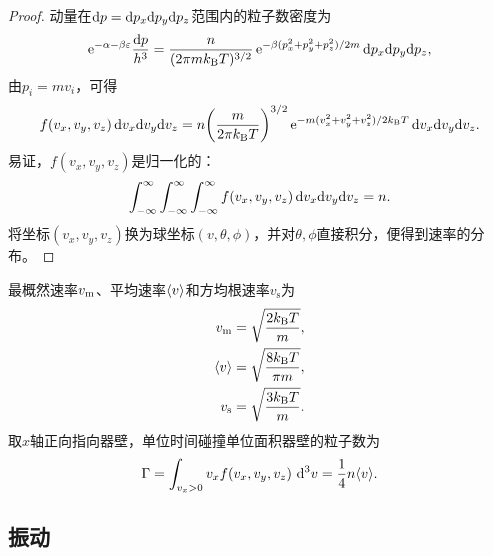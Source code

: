 \begin{proof}
	动量在$\mathop{}\!\mathrm{d} p = \mathop{}\!\mathrm{d} p_x\mathrm{d} p_y\mathrm{d} p_z$范围内的粒子数密度为
	\[
		\mathop{}\!\mathrm{e}^{-\alpha-\beta\varepsilon}\frac{\mathop{}\!\mathrm{d} p}{h^3} = \frac n{(2\pi mk_{\mathrm{B}} T)^{3/2}}\mathop{}\!\mathrm{e}^{-\beta(p_x^2+p_y^2+p_z^2)/2m}\mathop{}\!\mathrm{d} p_x\mathrm{d} p_y\mathrm{d} p_z,
	\]
	由$p_i = mv_i$，可得
	\begin{equation}
		f(v_x,v_y,v_z)\mathop{}\!\mathrm{d} v_x\mathrm{d} v_y\mathrm{d} v_z = n\biggl(\frac m{2\pi k_{\mathrm{B}} T}\biggr)^{3/2}\mathop{}\!\mathrm{e}^{-m(v_x^2+v_y^2+v_z^2)/2k_{\mathrm{B}} T}\mathop{}\!\mathrm{d} v_x\mathrm{d} v_y\mathrm{d} v_z.
	\end{equation}
	易证，$f(v_x,v_y,v_z)$是归一化的：
	\[
		\int_{-\infty}^\infty\int_{-\infty}^\infty\int_{-\infty}^\infty f(v_x,v_y,v_z)\mathop{}\!\mathrm{d} v_x\mathrm{d} v_y\mathrm{d} v_z = n.
	\]
	将坐标$(v_x,v_y,v_z)$换为球坐标$(v,\theta,\phi)$，并对$\theta,\phi$直接积分，便得到速率的分布。
\end{proof}

\begin{corollary}
	最概然速率$v_\mathrm m$、平均速率$\langle v\rangle$和方均根速率$v_\mathrm s$为
	\begin{subequations}
		\begin{align}
			v_\mathrm m &= \sqrt{\frac{2k_{\mathrm{B}} T}m},\\
			\langle v\rangle &= \sqrt{\frac{8k_{\mathrm{B}} T}{\pi m}},\\
			v_\mathrm s &= \sqrt{\frac{3k_{\mathrm{B}} T}m}.
		\end{align}
	\end{subequations}
	取$x$轴正向指向器壁，单位时间碰撞单位面积器壁的粒子数为
	\begin{equation}
		\Gamma = \int_{v_x>0} v_x f(v_x,v_y,v_z)\,\mathop{}\!\mathrm{d}^3v = \frac14n\langle v\rangle.
	\end{equation}
\end{corollary}

\subsection{振动}
\label{ssec:vibration}

